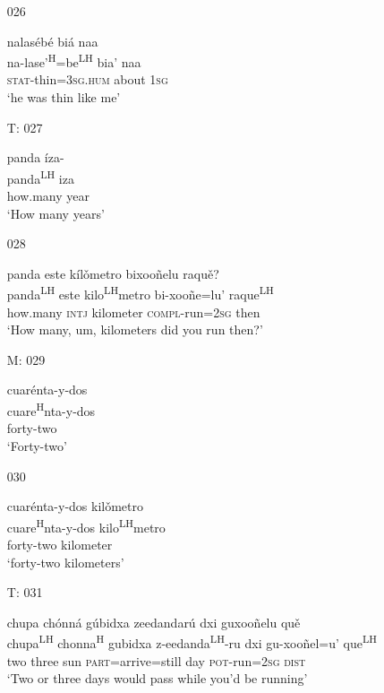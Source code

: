 \begin{itemize}
\item[026]
    
\glll nalas\'{e}b\'{e} bi\'{a} naa\\
na-lase'\textsuperscript{H}=be\textsuperscript{LH} bia' naa\\
\textsc{stat}-thin=\textsc{3sg.hum} about \textsc{1sg}\\
\glt `he was thin like me'
 


\item[T: 027]
   
panda \'{i}za-\\
panda\textsuperscript{LH} iza\\
how.many year\\
\glt `How many years'
 

\item[028]
   
panda este k\'{i}l\v{o}metro bixoo\~{n}elu raqu\v{e}?\\
panda\textsuperscript{LH}  este kilo\textsuperscript{LH}metro bi-xoo\~{n}e=lu' raque\textsuperscript{LH} \\
how.many \textsc{intj} kilometer \textsc{compl}-run=\textsc{2sg} then\\
\glt `How many, um, kilometers did you run then?'
 

\item[M: 029]
  
\glll cuar\'{e}nta-y-dos\\
cuare\textsuperscript{H}nta-y-dos\\
forty-two\\
\glt `Forty-two'
 

\item[030]
  
\glll cuar\'{e}nta-y-dos kil\v{o}metro\\
cuare\textsuperscript{H}nta-y-dos kilo\textsuperscript{LH}metro\\
forty-two kilometer\\
\glt `forty-two kilometers'
 

\item[T: 031]
 
\glll  chupa ch\'{o}nn\'{a} g\'{u}bidxa zeedandar\'{u} dxi guxoo\~{n}elu qu\v{e}\\
chupa\textsuperscript{LH} chonna\textsuperscript{H} gubidxa z-eedanda\textsuperscript{LH}-ru dxi gu-xoo\~{n}el=u' que\textsuperscript{LH}\\
two three sun \textsc{part}=arrive=still day \textsc{pot}-run=\textsc{2sg} \textsc{dist}\\
\glt `Two or three days would pass while you'd be running'
 


\end{itemize}
